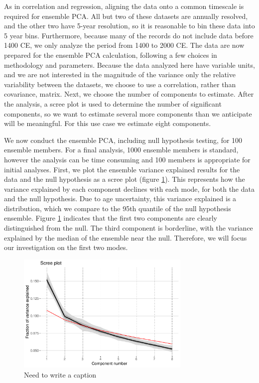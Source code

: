 \documentclass[gchron, manuscript]{copernicus}
\begin{document}
As in correlation and regression, aligning the data onto a common timescale is required for ensemble PCA.
All but two of these datasets are annually resolved, and the other two have 5-year resolution, so it is reasonable to bin these data into 5 year bins.
Furthermore, because many of the records do not include data before 1400 CE, we only analyze the period from 1400 to 2000 CE.
The data are now prepared for the ensemble PCA calculation, following a few choices in methodology and parameters.
Because the data analyzed here have variable units, and we are not interested in the magnitude of the variance only the relative variability between the datasets, we choose to use a correlation, rather than covariance, matrix.
Next, we choose the number of components to estimate.
After the analysis, a scree plot is used to determine the number of significant components, so we want to estimate several more components than we anticipate will be meaningful.
For this use case we estimate eight components.

We now conduct the ensemble PCA, including null hypothesis testing, for 100 ensemble members.
For a final analysis, 1000 ensemble members is standard, however the analysis can be time consuming and 100 members is appropriate for initial analyses.
First, we plot the ensemble variance explained results for the data and the null hypothesis as a scree plot (figure \ref{fig:scree}).
This represents how the variance explained by each component declines with each mode, for both the data and the null hypothesis. Due to age uncertainty, this variance explained is a distribution, which we compare to the 95th quantile of the null hypothesis ensemble.
Figure \ref{fig:scree} indicates that the first two components are clearly distinguished from the null.
The third component is borderline, with the variance explained by the median of the ensemble near the null.
Therefore, we will focus our investigation on the first two modes.

\begin{figure}
\includegraphics[width=8.3cm]{geoChronR-paper_files/figure-latex/scree-1} \caption{Need to write a caption}\label{fig:scree}
\end{figure}
\end{document}
